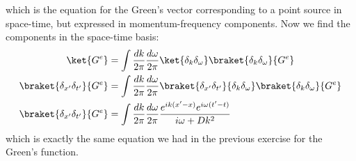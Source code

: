 which is the equation for the Green's vector corresponding to a point source in space-time, but expressed in momentum-frequency components.
Now we find the components in the space-time basis:
\begin{align*}
  \ket{G^e}
    &= \int \frac{dk}{2\pi} \frac{d\omega}{2\pi} \ket{\delta_k \delta_\omega} \braket{\delta_k \delta_\omega}{G^e} \\
  \braket{\delta_{x'} \delta_{t'}}{G^e}
    &= \int \frac{dk}{2\pi} \frac{d\omega}{2\pi} \braket{\delta_{x'} \delta_{t'}}{\delta_k \delta_\omega} \braket{\delta_k \delta_\omega}{G^e} \\
  \braket{\delta_{x'} \delta_{t'}}{G^e}
    &= \int \frac{dk}{2\pi} \frac{d\omega}{2\pi} \frac{e^{i k (x' - x)} e^{i \omega (t' - t)}}{i \omega + D k^2} \\
\end{align*}
which is exactly the same equation we had in the previous exercise for the Green's function.
